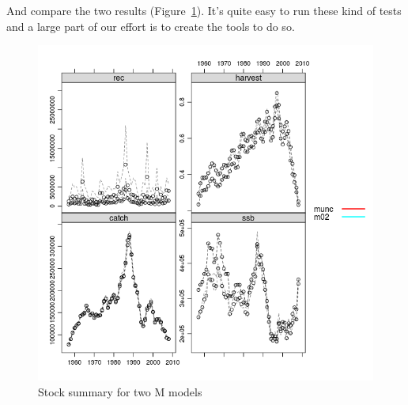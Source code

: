 \documentclass[a4paper,english,10pt]{article}\usepackage[]{graphicx}\usepackage[]{color}
\makeatletter
\def\maxwidth{ %
  \ifdim\Gin@nat@width>\linewidth
    \linewidth
  \else
    \Gin@nat@width
  \fi
}
\newenvironment{knitrout}{}{} %
\makeatother
\begin{document}
And compare the two results (Figure~\ref{fig:mprop}). It's quite easy to run these kind of tests and a large part of our effort is to create the tools to do so. 

\begin{knitrout}
\color{fgcolor}\begin{figure}[H]

{\centering \includegraphics[width=\maxwidth]{figure/mprop-1} 

}

\caption[Stock summary for two M models]{Stock summary for two M models}\label{fig:mprop}
\end{figure}


\end{knitrout}


\end{document}
